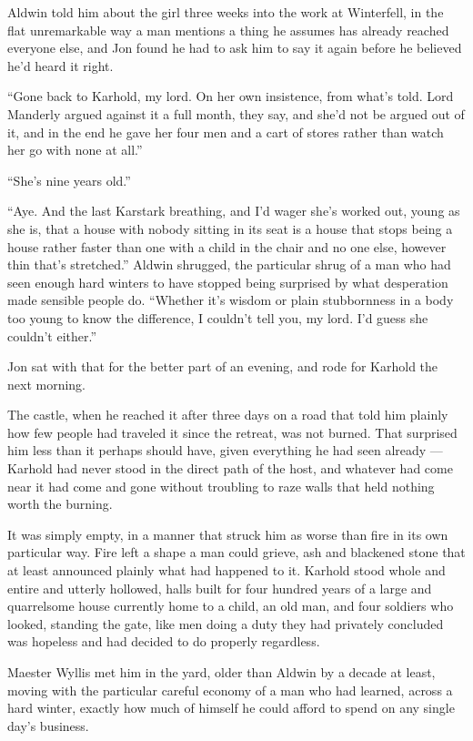 Aldwin told him about the girl three weeks into the work at Winterfell, in the flat unremarkable way a man mentions a thing he assumes has already reached everyone else, and Jon found he had to ask him to say it again before he believed he’d heard it right.

“Gone back to Karhold, my lord. On her own insistence, from what’s told. Lord Manderly argued against it a full month, they say, and she’d not be argued out of it, and in the end he gave her four men and a cart of stores rather than watch her go with none at all.”

“She’s nine years old.”

“Aye. And the last Karstark breathing, and I’d wager she’s worked out, young as she is, that a house with nobody sitting in its seat is a house that stops being a house rather faster than one with a child in the chair and no one else, however thin that’s stretched.” Aldwin shrugged, the particular shrug of a man who had seen enough hard winters to have stopped being surprised by what desperation made sensible people do. “Whether it’s wisdom or plain stubbornness in a body too young to know the difference, I couldn’t tell you, my lord. I’d guess she couldn’t either.”

Jon sat with that for the better part of an evening, and rode for Karhold the next morning.

\sceneBreak

The castle, when he reached it after three days on a road that told him plainly how few people had traveled it since the retreat, was not burned. That surprised him less than it perhaps should have, given everything he had seen already — Karhold had never stood in the direct path of the host, and whatever had come near it had come and gone without troubling to raze walls that held nothing worth the burning.

It was simply empty, in a manner that struck him as worse than fire in its own particular way. Fire left a shape a man could grieve, ash and blackened stone that at least announced plainly what had happened to it. Karhold stood whole and entire and utterly hollowed, halls built for four hundred years of a large and quarrelsome house currently home to a child, an old man, and four soldiers who looked, standing the gate, like men doing a duty they had privately concluded was hopeless and had decided to do properly regardless.

\sceneBreak

Maester Wyllis met him in the yard, older than Aldwin by a decade at least, moving with the particular careful economy of a man who had learned, across a hard winter, exactly how much of himself he could afford to spend on any single day’s business.

